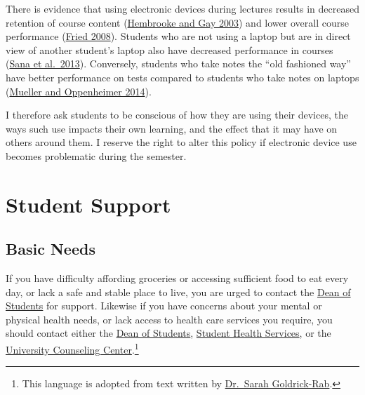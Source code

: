 \documentclass[]{book}
\let\rmarkdownfootnote\footnote%
\def\footnote{\protect\rmarkdownfootnote}
\begin{document}
There is evidence that using electronic devices during lectures results in decreased retention of course content (\href{https://link.springer.com/article/10.1007/BF02940852}{Hembrooke and Gay 2003}) and lower overall course performance (\href{https://www.sciencedirect.com/science/article/pii/S0360131506001436}{Fried 2008}). Students who are not using a laptop but are in direct view of another student's laptop also have decreased performance in courses (\href{https://www.sciencedirect.com/science/article/pii/S0360131512002254}{Sana et al.~2013}). Conversely, students who take notes the ``old fashioned way'' have better performance on tests compared to students who take notes on laptops (\href{http://journals.sagepub.com/doi/abs/10.1177/0956797614524581}{Mueller and Oppenheimer 2014}).

I therefore ask students to be conscious of how they are using their devices, the ways such use impacts their own learning, and the effect that it may have on others around them. I reserve the right to alter this policy if electronic device use becomes problematic during the semester.

\hypertarget{student-support}{%
\section{Student Support}\label{student-support}}

\hypertarget{basic-needs}{%
\subsection{Basic Needs}\label{basic-needs}}

If you have difficulty affording groceries or accessing sufficient food to eat every day, or lack a safe and stable place to live, you are urged to contact the \href{https://www.slu.edu/student-development/dean-of-students/index.php}{Dean of Students} for support. Likewise if you have concerns about your mental or physical health needs, or lack access to health care services you require, you should contact either the \href{https://www.slu.edu/student-development/dean-of-students/index.php}{Dean of Students}, \href{https://www.slu.edu/life-at-slu/student-health/index.php}{Student Health Services}, or the \href{https://www.slu.edu/life-at-slu/university-counseling/index.php}{University Counseling Center}.\footnote{This language is adopted from text written by \href{https://medium.com/@saragoldrickrab/basic-needs-security-and-the-syllabus-d24cc7afe8c9}{Dr.~Sarah Goldrick-Rab}.}
\end{document}
